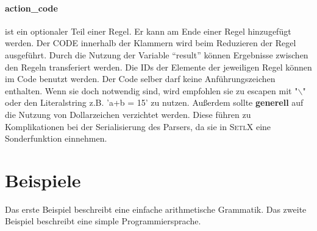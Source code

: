 \paragraph{action\_code} ist ein optionaler Teil einer Regel. Er kann am Ende einer Regel hinzugefügt werden. Der CODE innerhalb der Klammern  wird beim Reduzieren der Regel ausgeführt. Durch die Nutzung der Variable "`result"' können Ergebnisse zwischen den Regeln transferiert werden. Die IDs der Elemente der jeweiligen Regel können im Code benutzt werden. Der Code selber darf keine Anführungszeichen enthalten. Wenn sie doch notwendig sind, wird empfohlen sie zu escapen mit "$\backslash$" oder den Literalstring z.B. 'a+b = 15' zu nutzen. Außerdem sollte \textbf{generell} auf die Nutzung von Dollarzeichen verzichtet werden. Diese führen zu Komplikationen bei der Serialisierung des Parsers, da sie in \textsc{SetlX} eine Sonderfunktion einnehmen. 
\newpage
\section{Beispiele}
Das erste Beispiel beschreibt eine einfache arithmetische Grammatik.
Das zweite Beispiel beschreibt eine simple Programmiersprache.
